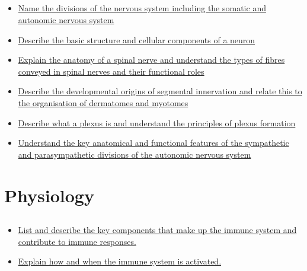 \documentclass[10pt, a4paper]{article}
\newcommand{\MYhref}[3][blue]{\href{#2}{\color{#1}{#3}}}%
\begin{document}
\subsection{\MYhref[melbBlue]{https://notion.so/18cbb1fdf33140fab0332e2ecfbeb475}{Foundations of The Nervous System \& Neural Control}} \begin{itemize} \item \href{https://www.notion.so/b7c66e2a10b64344948847c5eec9eaab}{Name the divisions of the nervous system including the somatic
and autonomic nervous system} \item \href{https://www.notion.so/0fe33dd3100f49d0af140b616028b546}{Describe the basic structure and cellular components of a neuron} \item \href{https://www.notion.so/634f2d48602a44ccaafc9feda269d2c9}{Explain the anatomy of a spinal nerve and understand the types of fibres conveyed in spinal nerves and their functional roles} \item \href{https://www.notion.so/c0ba5694371e47c9a8aeda766944e15e}{Describe the developmental origins of segmental innervation and relate this to the organisation of dermatomes and myotomes} \item \href{https://www.notion.so/92a77a2882034bc1b5adbf0b5d62b72d}{Describe what a plexus is and understand the principles of
plexus formation} \item \href{https://www.notion.so/d989a3be38ae4e30b02d0dbcd8635a30}{Understand the key anatomical and functional features of the sympathetic and parasympathetic divisions of the autonomic nervous system} \end{itemize}
\section{Physiology}
\subsection{\MYhref[melbBlue]{https://notion.so/0c8693cdce4746c193c3004926858b66}{Overview of the Immune System}} \begin{itemize} \item \href{https://www.notion.so/874304e034cf40ff93246433d687fc8b}{List and describe the key components that make up the immune system and contribute to immune responses.} \item \href{https://www.notion.so/16c8ef0eea6a4039a01468f9da51dcc8}{Explain how and when the immune system is activated.} \end{itemize}
\end{document}
